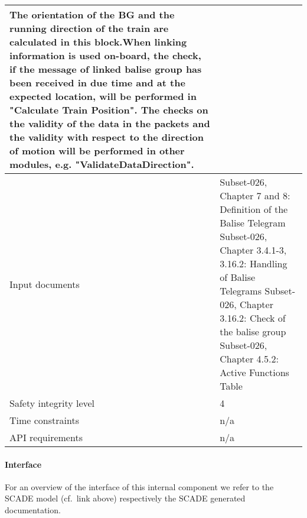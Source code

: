 \begin{longtable}{p{}p{}}
The orientation of the BG and the running direction of the train are calculated in this block.When linking information is used on-board, the check, if the message of linked balise group has been received in due time and at the expected location, will be performed in "Calculate Train Position". The checks on the validity of the data in the packets and the validity with respect to the direction of motion
will be performed in other modules, e.g. "ValidateDataDirection".\\
\midrule
Input documents	& 
Subset-026, Chapter 7 and 8: Definition of the Balise Telegram\newline
Subset-026, Chapter 3.4.1-3, 3.16.2: Handling of Balise Telegrams\newline
Subset-026, Chapter 3.16.2: Check of the balise group\newline
Subset-026, Chapter 4.5.2: Active Functions Table\\
\midrule
Safety integrity level	& 4 \\
\midrule
Time constraints		& n/a \\
\midrule
API requirements 		& n/a \\
\bottomrule
\end{longtable}


\paragraph{Interface}

For an overview of the interface of this internal component we refer to the SCADE model (cf.~link above) respectively the SCADE generated documentation.
